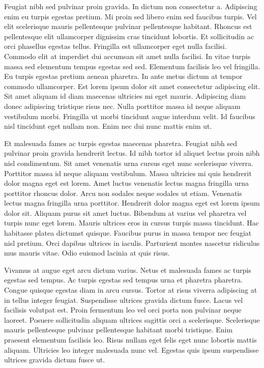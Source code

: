 \documentclass[11pt,a4paper]{article}
\begin{document}
Feugiat nibh sed pulvinar proin gravida. In dictum non consectetur a. Adipiscing enim eu turpis egestas pretium. Mi proin sed libero enim sed faucibus turpis. Vel elit scelerisque mauris pellentesque pulvinar pellentesque habitant. Rhoncus est pellentesque elit ullamcorper dignissim cras tincidunt lobortis. Et sollicitudin ac orci phasellus egestas tellus. Fringilla est ullamcorper eget nulla facilisi. Commodo elit at imperdiet dui accumsan sit amet nulla facilisi. In vitae turpis massa sed elementum tempus egestas sed sed. Elementum facilisis leo vel fringilla. Eu turpis egestas pretium aenean pharetra. In ante metus dictum at tempor commodo ullamcorper. Est lorem ipsum dolor sit amet consectetur adipiscing elit. Sit amet aliquam id diam maecenas ultricies mi eget mauris. Adipiscing diam donec adipiscing tristique risus nec. Nulla porttitor massa id neque aliquam vestibulum morbi. Fringilla ut morbi tincidunt augue interdum velit. Id faucibus nisl tincidunt eget nullam non. Enim nec dui nunc mattis enim ut.

Et malesuada fames ac turpis egestas maecenas pharetra. Feugiat nibh sed pulvinar proin gravida hendrerit lectus. Id nibh tortor id aliquet lectus proin nibh nisl condimentum. Sit amet venenatis urna cursus eget nunc scelerisque viverra. Porttitor massa id neque aliquam vestibulum. Massa ultricies mi quis hendrerit dolor magna eget est lorem. Amet luctus venenatis lectus magna fringilla urna porttitor rhoncus dolor. Arcu non sodales neque sodales ut etiam. Venenatis lectus magna fringilla urna porttitor. Hendrerit dolor magna eget est lorem ipsum dolor sit. Aliquam purus sit amet luctus. Bibendum at varius vel pharetra vel turpis nunc eget lorem. Mauris ultrices eros in cursus turpis massa tincidunt. Hac habitasse platea dictumst quisque. Faucibus purus in massa tempor nec feugiat nisl pretium. Orci dapibus ultrices in iaculis. Parturient montes nascetur ridiculus mus mauris vitae. Odio euismod lacinia at quis risus.

Vivamus at augue eget arcu dictum varius. Netus et malesuada fames ac turpis egestas sed tempus. Ac turpis egestas sed tempus urna et pharetra pharetra. Congue quisque egestas diam in arcu cursus. Tortor at risus viverra adipiscing at in tellus integer feugiat. Suspendisse ultrices gravida dictum fusce. Lacus vel facilisis volutpat est. Proin fermentum leo vel orci porta non pulvinar neque laoreet. Posuere sollicitudin aliquam ultrices sagittis orci a scelerisque. Scelerisque mauris pellentesque pulvinar pellentesque habitant morbi tristique. Enim praesent elementum facilisis leo. Risus nullam eget felis eget nunc lobortis mattis aliquam. Ultricies leo integer malesuada nunc vel. Egestas quis ipsum suspendisse ultrices gravida dictum fusce ut.
\end{document}
